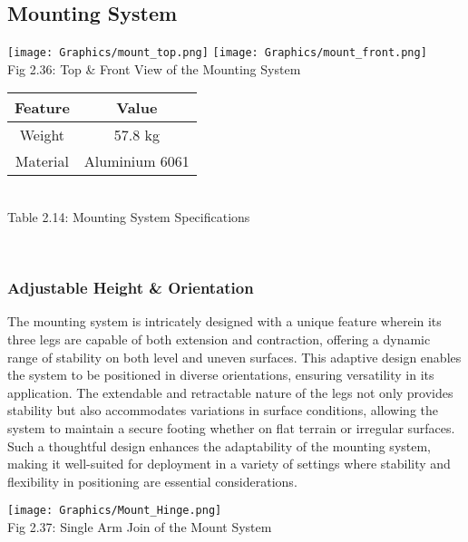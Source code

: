 \documentclass[a4,10pt]{report}
\begin{document}
\subsection{Mounting System}
\begin{center}
    \texttt{[image: Graphics/mount\_top.png]}
    \texttt{[image: Graphics/mount\_front.png]} \\
    \normalsize{Fig 2.36: Top \& Front View of the Mounting System} \\ 
\vspace{2mm}
\begin{tabular}{|c|c|}
    \hline
    Feature & Value \\
    \hline
    Weight & 57.8 kg \\
    Material & Aluminium 6061 \\
    \hline
\end{tabular} \\
\normalsize{Table 2.14: Mounting System Specifications} \\
\end{center} \\

\subsubsection{Adjustable Height \& Orientation}
The mounting system is intricately designed with a unique feature wherein its three legs are capable of both extension and contraction, offering a dynamic range of stability on both level and uneven surfaces. This adaptive design enables the system to be positioned in diverse orientations, ensuring versatility in its application. The extendable and retractable nature of the legs not only provides stability but also accommodates variations in surface conditions, allowing the system to maintain a secure footing whether on flat terrain or irregular surfaces. Such a thoughtful design enhances the adaptability of the mounting system, making it well-suited for deployment in a variety of settings where stability and flexibility in positioning are essential considerations.
\begin{center}
    \texttt{[image: Graphics/Mount\_Hinge.png]} \\
    \normalsize{Fig 2.37: Single Arm Join of the Mount System}
\end{center}
\end{document}
